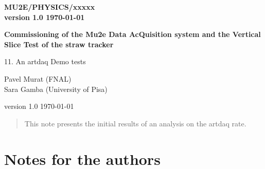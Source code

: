 \documentclass[12pt]{article}
\begin{document}
\begin{titlepage}
  \begin{flushright}
    \bf {MU2E/PHYSICS/xxxxx} \\
    version 1.0
    \today
 \end{flushright}

  \vspace{1cm}

  \begin{center}
    {\Large \bf Commissioning of the Mu2e Data AcQuisition system and the Vertical Slice Test of the straw tracker

      \vspace{0.3in}

      11. An artdaq Demo tests
    }

    \vspace{1cm}
    Pavel Murat (FNAL) \\
    Sara Gamba (University of Pisa)

   
    version 1.0
    \today
 \end{center}

  \begin{abstract}
    This note presents the initial results of an analysis on the artdaq rate.
    \vspace{0.2in}
  \end{abstract}

\end{titlepage}
%
%
%
{\tableofcontents}
% 

\newpage

\section {Notes for the authors}
\end{document}

